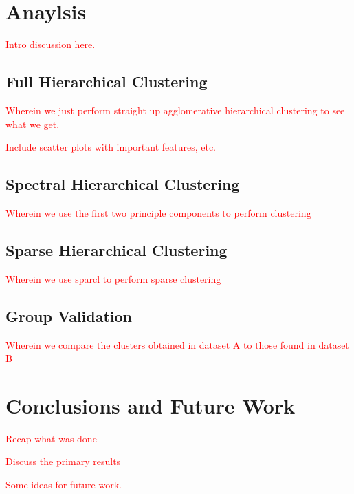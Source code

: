 \documentclass[10pt]{article}
\newcommand{\todo}[1]{\textcolor{red}{#1}}
\begin{document}

  


\section{Anaylsis}

\todo{Intro discussion here.}

\subsection{Full Hierarchical Clustering}

\todo{Wherein we just perform straight up agglomerative hierarchical clustering to see what we get.}

\todo{Include scatter plots with important features, etc.}

\subsection{Spectral Hierarchical Clustering}

\todo{Wherein we use the first two principle components to perform clustering}

\subsection{Sparse Hierarchical Clustering}

\todo{Wherein we use sparcl to perform sparse clustering}

\subsection{Group Validation}

\todo{Wherein we compare the clusters obtained in dataset A to those found in dataset B}

\section{Conclusions and Future Work}

\todo{Recap what was done}

\todo{Discuss the primary results}

\todo{Some ideas for future work.}


\printbibliography
\end{document}
